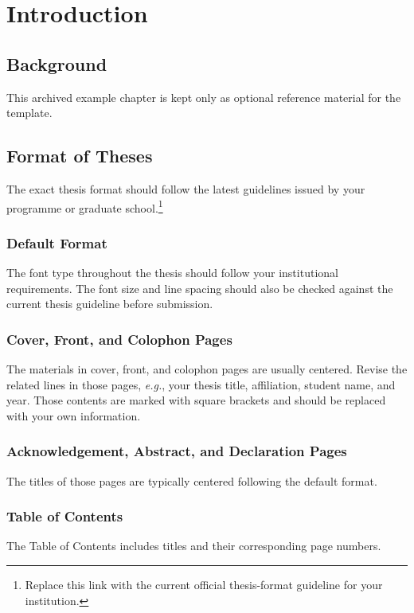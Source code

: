 \chapter{Introduction}
\label{chapter1}

\section{Background}
\label{chapter1.Background}

This archived example chapter is kept only as optional reference material for the template.

\section{Format of Theses}

The exact thesis format should follow the latest guidelines issued by your programme or graduate school.\footnote{Replace this link with the current official thesis-format guideline for your institution.}

\subsection{Default Format}
The font type throughout the thesis should follow your institutional requirements.
The font size and line spacing should also be checked against the current thesis guideline before submission.

\subsection{Cover, Front, and Colophon Pages}
The materials in cover, front, and colophon pages are usually centered.
Revise the related lines in those pages, \textit{e.g.}, your thesis title, affiliation, student name, and year.
Those contents are marked with square brackets and should be replaced with your own information.

\subsection{Acknowledgement, Abstract, and Declaration Pages}
The titles of those pages are typically centered following the default format.

\subsection{Table of Contents}
The Table of Contents includes titles and their corresponding page numbers.

